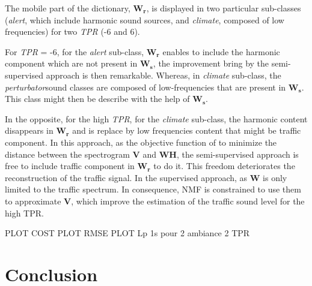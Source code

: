 \documentclass[twocolumn,a4paper,10pt]{article}
\begin{document}
The mobile part of the dictionary, $\mathbf{W_r}$, is displayed in two particular sub-classes (\textit{alert}, which include harmonic sound sources, and \textit{climate}, composed of low frequencies) for two \textit{TPR} (-6 and 6).

For \textit{TPR} = -6, for the \textit{alert} sub-class, $\mathbf{W_r}$ enables to include the harmonic component which are not present in $\mathbf{W_s}$, the improvement bring by the semi-supervised approach is then remarkable. Whereas, in \textit{climate} sub-class, the \textit{perturbator}sound classes are composed of low-frequencies that are present in $\mathbf{W_s}$. This class might then be describe with the help of $\mathbf{W_s}$. 

In the opposite, for the high \textit{TPR}, for the \textit{climate} sub-class, the harmonic content disappears in $\mathbf{W_r}$ and is replace by low frequencies content that might be traffic component. 
In this approach, as the objective function of to minimize the distance between the spectrogram $\mathbf{V}$ and $\mathbf{WH}$, the semi-supervised approach is free to include traffic component in $\mathbf{W_r}$ to do it. This freedom deteriorates the reconstruction of the traffic signal. In the supervised approach, as $\mathbf{W}$ is only limited to the traffic spectrum. In consequence, NMF is constrained to use them to approximate $\mathbf{V}$, which improve the estimation of the traffic sound level for the high TPR. 


PLOT COST
PLOT RMSE
PLOT Lp 1s pour 2 ambiance 2 TPR


\section{Conclusion}
\footnotesize


\end{document}
